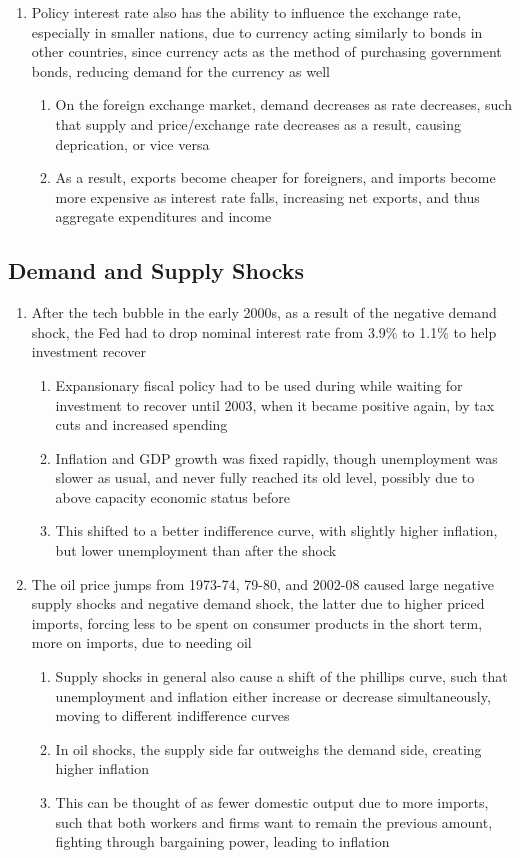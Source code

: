\documentclass[11 pt, twoside]{article}
\begin{document}
\begin{enumerate}
\item Policy interest rate also has the ability to influence the exchange rate, especially in smaller nations, due to currency acting similarly to bonds in other countries, since currency acts as the method of purchasing government bonds, reducing demand for the currency as well
\begin{enumerate}
\item On the foreign exchange market, demand decreases as rate decreases, such that supply and price/exchange rate decreases as a result, causing deprication, or vice versa
\item As a result, exports become cheaper for foreigners, and imports become more expensive as interest rate falls, increasing net exports, and thus aggregate expenditures and income
\end{enumerate}
\end{enumerate}

\subsection{Demand and Supply Shocks}
\begin{enumerate}
\item After the tech bubble in the early 2000s, as a result of the negative demand shock, the Fed had to drop nominal interest rate from 3.9\% to 1.1\% to help investment recover
\begin{enumerate}
\item Expansionary fiscal policy had to be used during while waiting for investment to recover until 2003, when it became positive again, by tax cuts and increased spending
\item Inflation and GDP growth was fixed rapidly, though unemployment was slower as usual, and never fully reached its old level, possibly due to above capacity economic status before
\item This shifted to a better indifference curve, with slightly higher inflation, but lower unemployment than after the shock
\end{enumerate}
\item The oil price jumps from 1973-74, 79-80, and 2002-08 caused large negative supply shocks and negative demand shock, the latter due to higher priced imports, forcing less to be spent on consumer products in the short term, more on imports, due to needing oil
\begin{enumerate}
\item Supply shocks in general also cause a shift of the phillips curve, such that unemployment and inflation either increase or decrease simultaneously, moving to different indifference curves
\item In oil shocks, the supply side far outweighs the demand side, creating higher inflation
\item This can be thought of as fewer domestic output due to more imports, such that both workers and firms want to remain the previous amount, fighting through bargaining power, leading to inflation 
\end{enumerate}
\end{enumerate}
\end{document}
